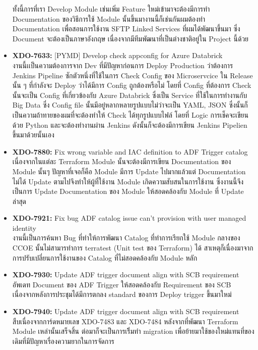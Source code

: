 \begin{itemize}
            ทั้งนี้การที่เรา Develop Module เช่นเพิ่ม Feature ใหม่เข้ามาจะต้องมีการทำ Documentation ของวิธีการใช้ Module นั้นขึ้นมางานนี้ก็เช่นกันผมต้องทำ Documentation เพื่อสอนการใช้งาน SFTP Linked Services ที่ผมได้พัฒนาขึ้นมา ซึ่ง Document จะต้องเป็นภาษาอังกฤษ เนื่องจากมีทีมพัฒนาที่เป็นต่างชาติอยู่ใน Project นี้ด้วย
      \item \textbf{XDO-7633:} [PYMD] Develop check appconfig for Azure Databrick\\
            งานนี้เเป็นความต้องการจาก Dev ที่มีปัญหาก่อนการ Deploy Production ว่าต้องการ Jenkins Pipeline ซักตัวหนึ่งที่ใช้ในการ Check Config ของ Microservcice ใน Release นั้น ๆ ที่กำลังจะ Deploy ว่าได้มีการ Config ถูกต้องหรือไม่ โดยที่ Config ที่ต้องการ Check นั้นจะเป็น Config ที่เกี่ยวข้องกับ Azure Databrick ซึ่งเป็น Service ที่ใช้ในการทำงานกับ Big Data ซึ่ง Config file นั้นมีอยู๋หลากหลายรูปแบบไม่ว่าจะเป็น YAML, JSON ซึ่งนั้นก็เป็นความถ้าทายของผมที่จะต้องทำให้ Check ได้ทุกรูปแบบไฟล์ โดยที่ Logic การเช็คจะเขียนด้วย Python และจะต้องทำงานผ่าน Jenkins ดังนั้นก็จะต้องมีการเขียน Jenkins Pipelien ขึ้นมาด้วยนั้นเอง
      \item \textbf{XDO-7880:} Fix wrong variable and IAC definition to ADF Trigger catalog\\
            เนื่องจากในแต่ละ Terraform Module นั้นจะต้องมีการเขียน Documentation ของ Module นั้นๆ ปัญหาที่เจอก็คือ Module มีการ Update ไปมากแล้วแต่ Documentation ไม่ได้ Update ตามไปจึงทำให้ผู้ที่ใช้งาน Module เกิดความสับสนในการใช้งาน ซึ่งงานนี้จึงเป็นการ Update Documentation ของ Module ให้สอดคล้องกับ Module ที่ Update ล่าสุด
      \item \textbf{XDO-7921:} Fix bug ADF catalog issue can't provision with user managed identity\\
            งานนี้เป็นการค้นหา Bug ที่ทำให้การพัฒนา Catalog ที่ทำการเรียกใช้ Module กลางของ CCOE นั้นไม่สามารทำการ terratest (Unit test ของ Terraform) ได้ สาเหตุก็เนื่องมาจากการปรับเปลี่ยนการใช้งานของ Catalog ที่ไม่สอดคล้องกับ Module หลัก
      \item \textbf{XDO-7930:} Update ADF trigger document align with SCB requirement\\
            อัพเดท Document ของ ADF Trigger ให้สอดคล้องกับ Requirement ของ SCB เนื่องจากหลังการประชุมได้มีการตกลง standard ของการ Deploy trigger ขึ้นมาใหม่
      \item \textbf{XDO-7940:} Update ADF trigger document align with SCB requirement\\
            สืบเนื่องจากการ์ดหมายเลข XDO-7483 และ XDO-7484 หลังจากที่พัฒนา Terraform Module เหล่านั้นเสร็จสิ้น ต่อมาก็จะเป็นการเริิ่มทำ migration เพื่อย้ายมาใช้ของใหม่แทนที่ของเดิมที่มีปัญหาเรื่องความยากในการจัดการ
\end{itemize}
